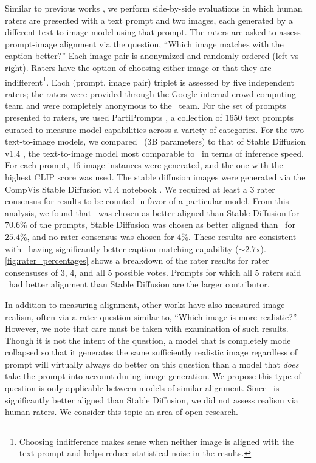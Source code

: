 Similar to previous works \citep{parti, imagen}, we perform side-by-side evaluations in which human raters are presented with a text prompt and two images, each generated by a different text-to-image model using that prompt. The raters are asked to assess prompt-image alignment via the question, ``Which image matches with the caption better?'' Each image pair is anonymized and randomly ordered (left vs right). Raters have the option of choosing either image or that they are indifferent\footnote{Choosing indifference makes sense when neither image is aligned with the text prompt and helps reduce statistical noise in the results.}. Each (prompt, image pair) triplet is assessed by five independent raters; the raters were provided through the Google internal crowd computing team and were completely anonymous to the \name~team. For the set of prompts presented to raters, we used PartiPrompts \citep{parti}, a collection of $1650$ text prompts curated to measure model capabilities across a variety of categories. For the two text-to-image models, we compared \name~($3$B parameters) to that of Stable Diffusion v1.4 \citep{ldm}, the text-to-image model most comparable to \name~in terms of inference speed. For each prompt, $16$ image instances were generated, and the one with the highest CLIP score \citep{clip} was used. The stable diffusion images were generated via the CompVis Stable Diffusion v1.4 notebook \citep{sdgeneration}. We required at least a $3$ rater consensus for results to be counted in favor of a particular model. From this analysis, we found that \name~was chosen as better aligned than Stable Diffusion for $70.6$\% of the prompts, Stable Diffusion was chosen as better aligned than \name~for $25.4$\%, and no rater consensus was chosen for $4$\%. These results are consistent with \name~having significantly better caption matching capability ($\sim\!2.7$x). \cref{fig:rater_percentages} shows a breakdown of the rater results for rater consensuses of $3$, $4$, and all $5$ possible votes. Prompts for which all $5$ raters said \name~had better alignment than Stable Diffusion are the larger contributor.

In addition to measuring alignment, other works \citep{parti, imagen} have also measured image realism, often via a rater question similar to, ``Which image is more realistic?''. However, we note that care must be taken with examination of such results. Though it is not the intent of the question, a model that is completely mode collapsed so that it generates the same sufficiently realistic image regardless of prompt will virtually always do better on this question than a model that \textit{does} take the prompt into account during image generation. We propose this type of question is only applicable between models of similar alignment. Since \name~is significantly better aligned than Stable Diffusion, we did not assess realism via human raters. We consider this topic an area of open research.

